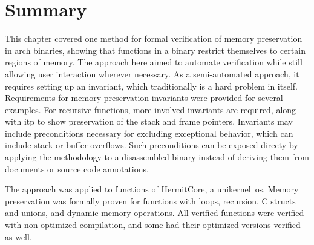 \section{Summary}
This chapter covered one method for formal verification
of memory preservation in \gls{arch} binaries,
showing that functions in a binary restrict themselves to certain regions of memory.
The approach here aimed to automate verification
while still allowing user interaction wherever necessary.
As a semi-automated approach,
it requires setting up an invariant, which traditionally is a hard problem in itself.
Requirements for memory preservation invariants were provided for several examples.
For recursive functions, more involved invariants are required,
along with \ac{itp} to show preservation of the stack and frame pointers.
Invariants may include preconditions necessary for excluding exceptional behavior,
which can include stack or buffer overflows.
Such preconditions can be exposed directy
by applying the methodology to a disassembled binary
instead of deriving them from documents or source code annotations.

The approach was applied to functions of HermitCore, a unikernel~\ac{os}.
Memory preservation was formally proven for functions with loops, recursion,
C structs and unions, and dynamic memory operations.
All verified functions were verified with non-optimized compilation,
and some had their optimized versions verified as well.

